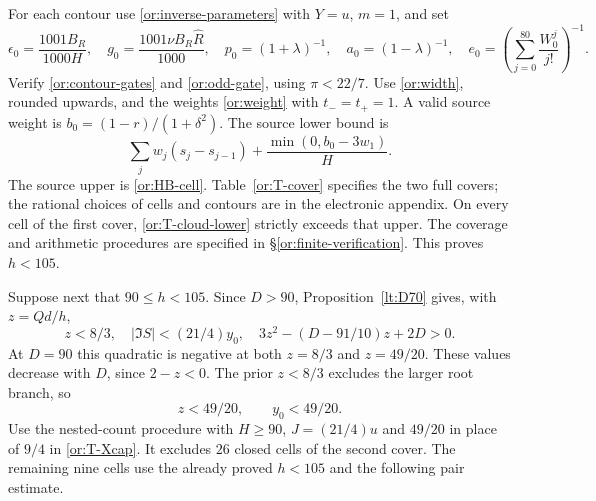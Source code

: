 For each contour use \eqref{or:inverse-parameters} with $Y=u$, $m=1$,
and set
\begin{equation}\label{or:automatic-contour}
 \epsilon_0=\frac{1001B_R}{1000H},\quad
 g_0=\frac{1001\nu B_R\widehat R}{1000},\quad
 p_0=(1+\lambda)^{-1},\quad a_0=(1-\lambda)^{-1},\quad
 e_0=\left(\sum_{j=0}^{80}\frac{W_0^j}{j!}\right)^{-1}.
\end{equation}
Verify \eqref{or:contour-gates} and \eqref{or:odd-gate}, using
$\pi<22/7$.  Use \eqref{or:width}, rounded upwards, and the weights
\eqref{or:weight} with $t_-=t_+=1$.  A valid source weight is
$b_0=(1-r)/(1+\delta^2)$.  The source lower bound is
\begin{equation}\label{or:T-cloud-lower}
  \sum_jw_j(s_j-s_{j-1})+\frac{\min(0,b_0-3w_1)}H.
\end{equation}
The source upper is \eqref{or:HB-cell}.  Table~\ref{or:T-cover}
specifies the two full covers; the rational choices of cells and
contours are in the electronic appendix.  On every cell of the first
cover, \eqref{or:T-cloud-lower} strictly exceeds that upper.  The
coverage and arithmetic procedures are specified in
\S\ref{or:finite-verification}.  This proves $h<105$.

Suppose next that $90\le h<105$.  Since $D>90$,
Proposition~\ref{lt:D70} gives, with $z=Qd/h$,
\[
 z<8/3,\quad |\Im S|<(21/4)y_0,\quad
                   3z^2-(D-91/10)z+2D>0.
\]
At $D=90$ this quadratic is negative at both $z=8/3$ and $z=49/20$.
These values decrease with $D$, since $2-z<0$.  The prior
$z<8/3$ excludes the larger root branch, so
\begin{equation}\label{or:T-ratio245}
                           z<49/20,\qquad y_0<49/20.
\end{equation}
Use the nested-count procedure with $H\ge90$, $J=(21/4)u$ and
$49/20$ in place of $9/4$ in \eqref{or:T-Xcap}.
It excludes $26$ closed cells of the second cover.  The remaining
nine cells use the already proved $h<105$ and the following pair
estimate.

